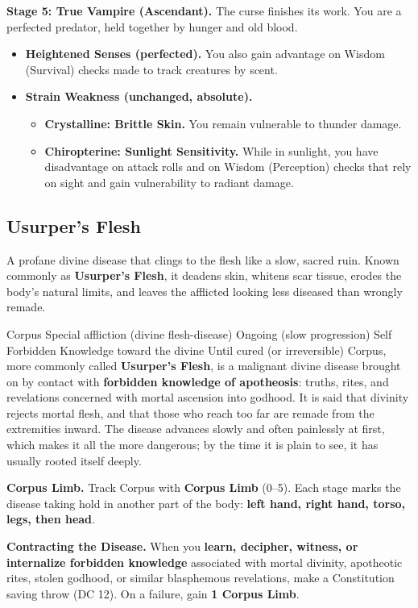 \textbf{Stage 5: True Vampire (Ascendant).}
The curse finishes its work. You are a perfected predator, held together by hunger and old blood.
\begin{itemize}
\item \textbf{Heightened Senses (perfected).} You also gain advantage on Wisdom (Survival) checks made to track creatures by scent.
\item \textbf{Strain Weakness (unchanged, absolute).}
\begin{itemize}
\item \textbf{Crystalline: Brittle Skin.} You remain vulnerable to thunder damage.
\item \textbf{Chiropterine: Sunlight Sensitivity.} While in sunlight, you have disadvantage on attack rolls and on Wisdom (Perception) checks that rely on sight and gain vulnerability to radiant damage.
\end{itemize}
\end{itemize}

\subsection{Usurper's Flesh}

A profane divine disease that clings to the flesh like a slow, sacred ruin. Known commonly as \textbf{Usurper's Flesh}, it deadens skin, whitens scar tissue, erodes the body's natural limits, and leaves the afflicted looking less diseased than wrongly remade.

\DndSpellHeader%
  {Corpus}
  {Special affliction (divine flesh-disease)}
  {Ongoing (slow progression)}
  {Self}
  {Forbidden Knowledge toward the divine}
  {Until cured (or irreversible)}
Corpus, more commonly called \textbf{Usurper's Flesh}, is a malignant divine disease brought on by contact with \textbf{forbidden knowledge of apotheosis}: truths, rites, and revelations concerned with mortal ascension into godhood. It is said that divinity rejects mortal flesh, and that those who reach too far are remade from the extremities inward. The disease advances slowly and often painlessly at first, which makes it all the more dangerous; by the time it is plain to see, it has usually rooted itself deeply.

\textbf{Corpus Limb.} Track Corpus with \textbf{Corpus Limb} (0--5). Each stage marks the disease taking hold in another part of the body: \textbf{left hand, right hand, torso, legs, then head}.

\textbf{Contracting the Disease.} When you \textbf{learn, decipher, witness, or internalize forbidden knowledge} associated with mortal divinity, apotheotic rites, stolen godhood, or similar blasphemous revelations, make a Constitution saving throw (DC 12). On a failure, gain \textbf{1 Corpus Limb}.

